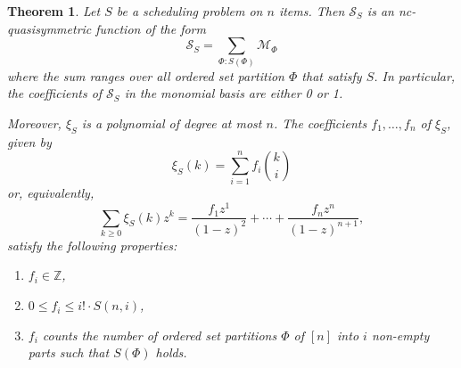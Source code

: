\documentclass[12pt,reqno]{amsart}
\numberwithin{definition}{section}
\newtheorem{theorem}[definition]{Theorem}
\theoremstyle{definition}
\newcommand{\ZZ}{\mathbb{Z}}
\newcommand{\SSS}{\mathcal{S}}
\newcommand{\ehr}{\operatorname{ehr}}
\newcommand{\ncM}{\mathcal{M}}
\begin{document}
\begin{theorem}
Let $S$ be a scheduling problem on $n$ items. Then $\SSS_S$ is an nc-quasisymmetric function of the form
\[
  \SSS_S = \sum_{\Phi:S(\Phi)} \ncM_\Phi
\]
where the sum ranges over all ordered set partition $\Phi$ that satisfy $S$. In particular, the coefficients of $\SSS_S$ in the monomial basis are either 0 or 1.

Moreover, $\xi_S$ is a polynomial of degree at most $n$. The coefficients $f_1,\ldots,f_n$ of $\xi_S$, given by
\[
  \xi_S(k) = \sum_{i=1}^n f_i\binom{k}{i}
\]
or, equivalently,
\[
  \sum_{k\geq 0} \xi_S(k)z^k = \frac{f_1z^1}{(1-z)^2} + \cdots + \frac{f_nz^{n}}{(1-z)^{n+1}},
\]
satisfy the following properties:
\begin{enumerate}
\item $f_i\in\ZZ$,
\item $0\leq f_i \leq i!\cdot S(n,i)$,
\item $f_i$ counts the number of ordered set partitions $\Phi$ of $[n]$ into $i$ non-empty parts such that $S(\Phi)$ holds.
\end{enumerate}
\end{theorem}
\end{document}
